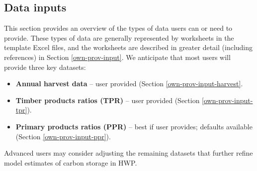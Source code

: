 \documentclass[
  openany]{book}
\providecommand{\tightlist}{%
  \setlength{\itemsep}{0pt}\setlength{\parskip}{0pt}}
\begin{document}
\hypertarget{own-over-inputSum}{%
\subsection{Data inputs}\label{own-over-inputSum}}

This section provides an overview of the types of data users can or need to provide. These types of data are generally represented by worksheets in the template Excel files, and the worksheets are described in greater detail (including references) in Section \ref{own-prov-input}. We anticipate that most users will provide three key datasets:

\begin{itemize}
\tightlist
\item
  \textbf{Annual harvest data} -- user provided (Section \ref{own-prov-input-harvest}.\\
\item
  \textbf{Timber products ratios (TPR)} -- user provided (Section \ref{own-prov-input-tpr}).\\
\item
  \textbf{Primary products ratios (PPR)} -- best if user provides; defaults available (Section \ref{own-prov-input-ppr}).
\end{itemize}

Advanced users may consider adjusting the remaining datasets that further refine model estimates of carbon storage in HWP.
\end{document}
